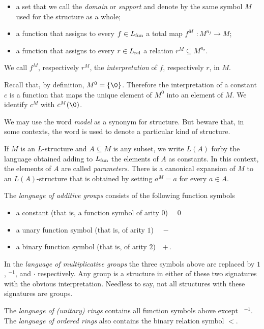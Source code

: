 \begin{itemize}
\item[1.] a set that we call the \emph{domain\/} or \emph{support} and denote by the same symbol $M$ used for the structure as a whole;
\item[2.] a function that assigns to every $f\in L_{\rm fun}$ a total map \emph{$f^M$ $: M^{n_f}\to M$};
\item[3.] a function that assigns to every  $r\in L_{\rm rel}$ a relation \emph{$r^M\subseteq M^{n_r}$}.
\end{itemize}
 We call $f^M$, respectively $r^M$, the \emph{interpretation\/} of $f$, respectively $r$, in $M$.
 
Recall that, by definition, $M^0=\{\0\}$. Therefore the interpretation of a constant $c$ is a function that maps the unique element of $M^0$ into an element of $M$. We identify $c^M$ with $c^M(\0)$.

We may use the word \emph{model\/} as a synonym for structure. But beware that, in some contexts, the word is used to denote a particular kind of structure.  

If $M$ is an $L$-structure and $A\subseteq M$ is any subset, we write \emph{$L(A)$\/} forby  the language obtained adding to $L_{\rm fun}$ the elements of $A$ as constants. In this context, the elements of $A$ are called \emph{parameters}. There is a canonical expansion of $M$ to an $L(A)$-structure that is obtained by setting $a^M=a$ for every $a\in A$.

\begin{example}\label{LgaLgmLau}
The \emph{language of additive groups\/} consists of the following function symbols\nobreak
\begin{itemize}
\item[1.] a constant (that is, a function symbol of arity $0$) \ \  $0$
\item[2.] a unary function symbol (that is, of arity $1$) \ \   $-$
\item[3.] a binary function symbol (that is, of arity $2$)\ \  $+ \,$.
\end{itemize}
In the \emph{language of multiplicative groups\/} the three symbols above are replaced by $1$, ${}^{-1}$, and $\cdot$ respectively. Any group is a structure in either of these two signatures with the obvious interpretation. Needless to say, not all structures with these signatures are groups. 

The \emph{language of (unitary) rings\/} contains all function symbols above except \ ${}^{-1}$. The  \emph{language of ordered rings\/} also contains the binary relation symbol $<$.\QED
\end{example}

